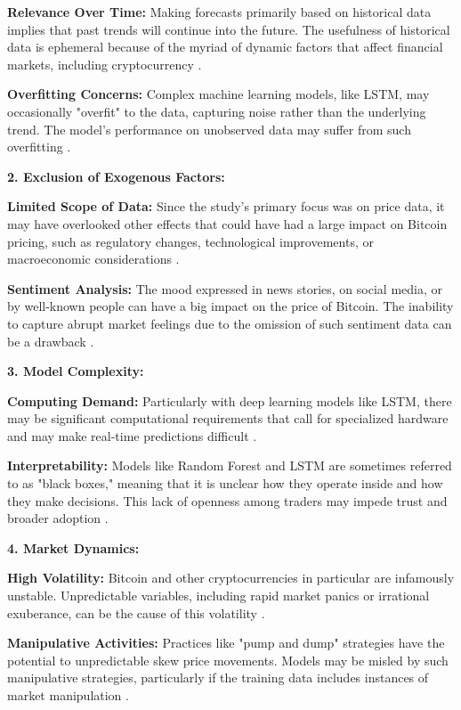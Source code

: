 \textbf{Relevance Over Time:} Making forecasts primarily based on historical data implies that past trends will continue into the future. The usefulness of historical data is ephemeral because of the myriad of dynamic factors that affect financial markets, including cryptocurrency \citep{tay2001application}.

\textbf{Overfitting Concerns:} Complex machine learning models, like LSTM, may occasionally "overfit" to the data, capturing noise rather than the underlying trend. The model's performance on unobserved data may suffer from such overfitting \citep{DBLP:journals/jcisd/HawkinsBM03}.

\textbf{2. Exclusion of Exogenous Factors:}

\textbf{Limited Scope of Data:} Since the study's primary focus was on price data, it may have overlooked other effects that could have had a large impact on Bitcoin pricing, such as regulatory changes, technological improvements, or macroeconomic considerations \citep{bouri_hedge_2017}.

\textbf{Sentiment Analysis:} The mood expressed in news stories, on social media, or by well-known people can have a big impact on the price of Bitcoin. The inability to capture abrupt market feelings due to the omission of such sentiment data can be a drawback \citep{kristoufek2015main}.

\textbf{3. Model Complexity:}

\textbf{Computing Demand:} Particularly with deep learning models like LSTM, there may be significant computational requirements that call for specialized hardware and may make real-time predictions difficult \citep{Goodfellow-et-al-2016}.

\textbf{Interpretability:} Models like Random Forest and LSTM are sometimes referred to as "black boxes," meaning that it is unclear how they operate inside and how they make decisions. This lack of openness among traders may impede trust and broader adoption \citep{DBLP:conf/kdd/Ribeiro0G16}.

\textbf{4. Market Dynamics:}

\textbf{High Volatility:} Bitcoin and other cryptocurrencies in particular are infamously unstable. Unpredictable variables, including rapid market panics or irrational exuberance, can be the cause of this volatility \citep{GANDAL201886}.

\textbf{Manipulative Activities:} Practices like "pump and dump" strategies have the potential to unpredictable skew price movements. Models may be misled by such manipulative strategies, particularly if the training data includes instances of market manipulation \citep{griffin2020bitcoin}.


